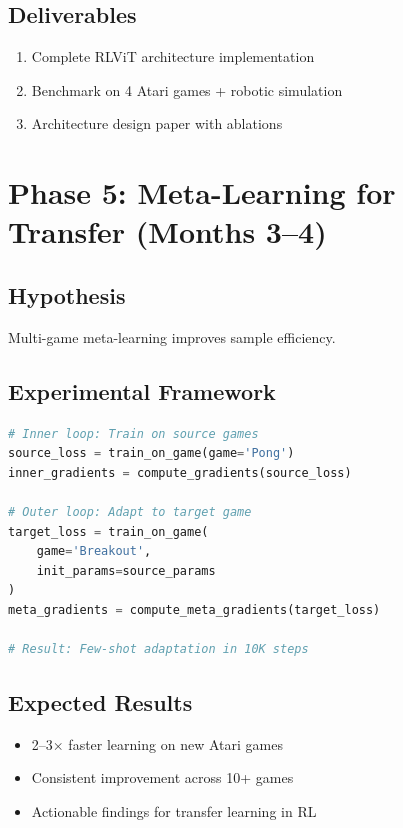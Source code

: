 \documentclass[12pt,a4paper,openany]{report}
\begin{document}
\subsection{Deliverables}

\begin{enumerate}
    \item Complete RLViT architecture implementation
    \item Benchmark on 4 Atari games + robotic simulation
    \item Architecture design paper with ablations
\end{enumerate}

\section{Phase 5: Meta-Learning for Transfer (Months 3--4)}

\subsection{Hypothesis}

Multi-game meta-learning improves sample efficiency.

\subsection{Experimental Framework}

\begin{lstlisting}[language=Python, caption=Meta-Learning Framework]
# Inner loop: Train on source games
source_loss = train_on_game(game='Pong')
inner_gradients = compute_gradients(source_loss)

# Outer loop: Adapt to target game
target_loss = train_on_game(
    game='Breakout',
    init_params=source_params
)
meta_gradients = compute_meta_gradients(target_loss)

# Result: Few-shot adaptation in 10K steps
\end{lstlisting}

\subsection{Expected Results}

\begin{itemize}
    \item 2--3$\times$ faster learning on new Atari games
    \item Consistent improvement across 10+ games
    \item Actionable findings for transfer learning in RL
\end{itemize}
\end{document}
